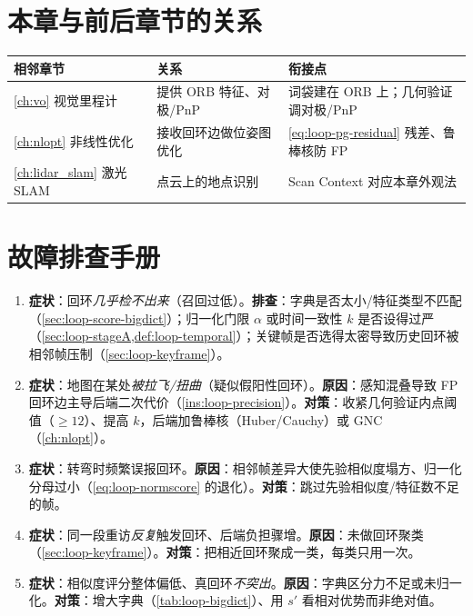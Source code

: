 \section*{本章与前后章节的关系}
\begin{table}[H]\centering\small
\begin{tabular}{lll}
\toprule
相邻章节 & 关系 & 衔接点 \\
\midrule
\cref{ch:vo} 视觉里程计 & 提供 ORB 特征、对极/PnP & 词袋建在 ORB 上；几何验证调对极/PnP \\
\cref{ch:nlopt} 非线性优化 & 接收回环边做位姿图优化 & \cref{eq:loop-pg-residual} 残差、鲁棒核防 FP \\
\cref{ch:lidar_slam} 激光 SLAM & 点云上的地点识别 & Scan Context 对应本章外观法\cite{kim2018scancontext} \\
\bottomrule
\end{tabular}
\end{table}

\section*{故障排查手册}
\begin{enumerate}
  \item \textbf{症状}：回环\emph{几乎检不出来}（召回过低）。\textbf{排查}：字典是否太小/特征类型不匹配（\cref{sec:loop-score-bigdict}）；归一化门限 $\alpha$ 或时间一致性 $k$ 是否设得过严（\cref{sec:loop-stageA,def:loop-temporal}）；关键帧是否选得太密导致历史回环被相邻帧压制（\cref{sec:loop-keyframe}）。
  \item \textbf{症状}：地图在某处\emph{被拉飞/扭曲}（疑似假阳性回环）。\textbf{原因}：感知混叠导致 FP 回环边主导后端二次代价（\cref{ins:loop-precision}）。\textbf{对策}：收紧几何验证内点阈值（$\ge 12$）、提高 $k$，后端加鲁棒核（Huber/Cauchy）或 GNC（\cref{ch:nlopt}）。
  \item \textbf{症状}：转弯时频繁误报回环。\textbf{原因}：相邻帧差异大使先验相似度塌方、归一化分母过小（\cref{eq:loop-normscore} 的退化）。\textbf{对策}：跳过先验相似度/特征数不足的帧。
  \item \textbf{症状}：同一段重访\emph{反复}触发回环、后端负担骤增。\textbf{原因}：未做回环聚类（\cref{sec:loop-keyframe}）。\textbf{对策}：把相近回环聚成一类，每类只用一次。
  \item \textbf{症状}：相似度评分整体偏低、真回环\emph{不突出}。\textbf{原因}：字典区分力不足或未归一化。\textbf{对策}：增大字典（\cref{tab:loop-bigdict}）、用 $s'$ 看相对优势而非绝对值。
\end{enumerate}
